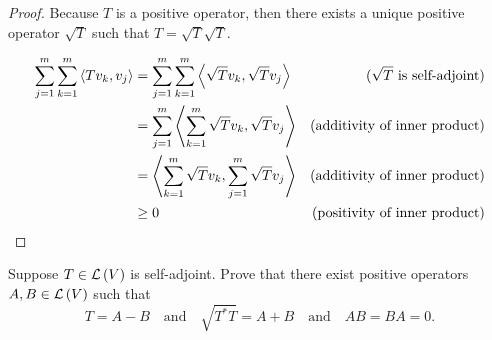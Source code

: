 \begin{proof}
    Because $T$ is a positive operator, then there exists a unique positive operator $\sqrt{T}$ such that $T = \sqrt{T}\sqrt{T}$.

    \begin{align*}
        \sum^{m}_{j=1}\sum^{m}_{k=1}\left\langle{Tv_{k}, v_{j}}\right\rangle & = \sum^{m}_{j=1}\sum^{m}_{k=1}\left\langle{\sqrt{T}v_{k}, \sqrt{T}v_{j}}\right\rangle & \text{($\sqrt{T}$ is self-adjoint)}  \\
                                                              & = \sum^{m}_{j=1}\left\langle{\sum^{m}_{k=1}\sqrt{T}v_{k}, \sqrt{T}v_{j}}\right\rangle & \text{(additivity of inner product)} \\
                                                              & = \left\langle{\sum^{m}_{k=1}\sqrt{T}v_{k}, \sum^{m}_{j=1}\sqrt{T}v_{j}}\right\rangle & \text{(additivity of inner product)} \\
                                                              & \geq 0                                                                 & \text{(positivity of inner product)}
    \end{align*}
\end{proof}
\newpage

\begin{exercise}
    Suppose $T\in\mathcal{L}\left({V}\right)$ is self-adjoint. Prove that there exist positive operators $A, B\in\mathcal{L}\left({V}\right)$ such that
    \[
        T = A - B\quad\text{and}\quad \sqrt{T^{*}T} = A + B\quad\text{and}\quad AB = BA = 0.
    \]
\end{exercise}

